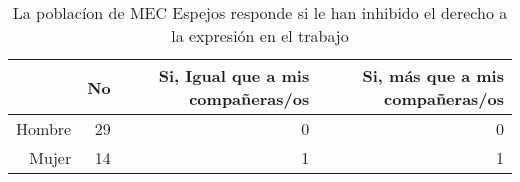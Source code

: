 \begin{table}[ht]
\centering
\begin{tabular}{rrrr}
  \hline
 & No & Si, Igual que a mis compañeras/os & Si, más que a mis compañeras/os \\ 
  \hline
Hombre &  29 &   0 &   0 \\ 
  Mujer &  14 &   1 &   1 \\ 
   \hline
\end{tabular}
\caption{La poblacíon de MEC Espejos responde
             si le han inhibido el derecho a la expresión en el trabajo} 
\end{table}

